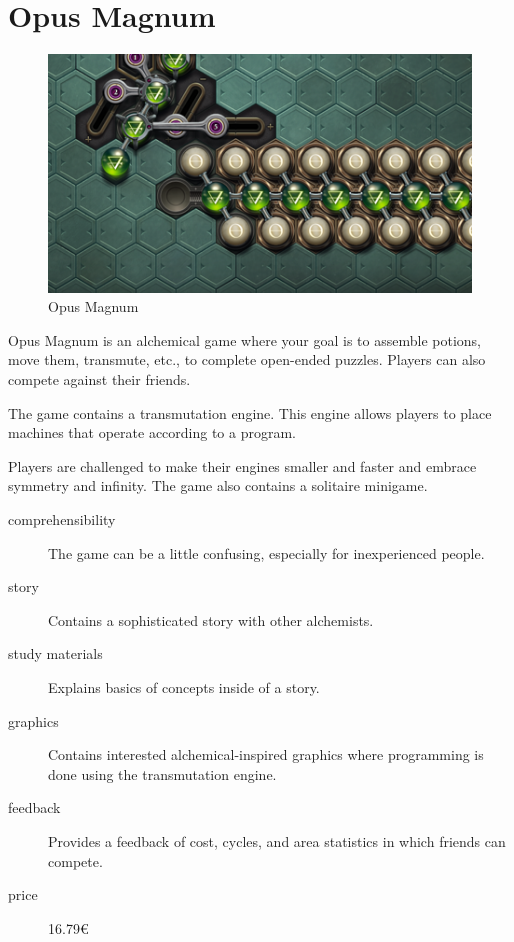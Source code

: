 \pagebreak
\section{Opus Magnum}
\label{similar-games:opus-magnum}

\begin{figure}
    \centering
    \includegraphics[width=1\linewidth]{assets/similar-games/opusmagnum.png}
    \caption{Opus Magnum~\cite{a2022_zachtronics}}
    \label{fig:opusmagnum}
\end{figure}

Opus Magnum is an alchemical game where your goal is to assemble potions, move them, transmute, etc., to complete open-ended puzzles.
Players can also compete against their friends.

The game contains a transmutation engine.
This engine allows players to place machines that operate according to a program.

Players are challenged to make their engines smaller and faster and embrace symmetry and infinity.
The game also contains a solitaire minigame.

\begin{description}
    \item[comprehensibility] The game can be a little confusing, especially for inexperienced people.
    \item[story] Contains a sophisticated story with other alchemists.
    \item[study materials] Explains basics of concepts inside of a story. 
    \item[graphics] Contains interested alchemical-inspired graphics where programming is done using the transmutation engine.
    \item[feedback] Provides a feedback of cost, cycles, and area statistics in which friends can compete.
    \item[price] 16.79€ 
\end{description}

